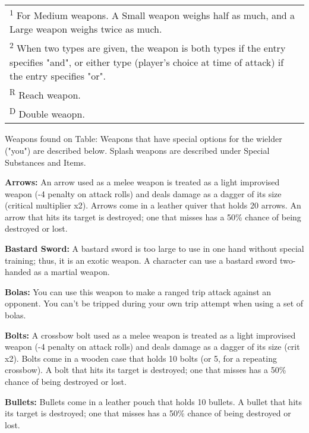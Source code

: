 \begin{table}[htb]
\begin{tabular}{l c c c c c c p{2cm}}
\multicolumn{8}{p{16cm}}{\textsuperscript{1} For Medium weapons. A Small weapon weighs half as much, and a Large weapon weighs twice as much.}\\
\multicolumn{8}{p{16cm}}{\textsuperscript{2} When two types are given, the weapon is both types if the entry specifies "and", or either type (player's choice at time of attack) if the entry specifies "or".}\\
\multicolumn{8}{p{16cm}}{\textsuperscript{R} Reach weapon.}\\
\multicolumn{8}{p{16cm}}{\textsuperscript{D} Double weaopn.}\\
\end{tabular}
\end{table}

Weapons found on Table: Weapons that have special options for the wielder ("you") 
are described below. Splash weapons are described under Special Substances and 
Items.

\textbf{Arrows:} An arrow used as a melee weapon is treated as a light improvised 
weapon (-4 penalty on attack rolls) and deals damage as a dagger of its size (critical 
multiplier x2). Arrows come in a leather quiver that holds 20 arrows. An arrow 
that hits its target is destroyed; one that misses has a 50\% chance of being destroyed 
or lost.

\textbf{Bastard Sword:} A bastard sword is too large to use in one hand without 
special training; thus, it is an exotic weapon. A character can use a bastard sword 
two-handed as a martial weapon.

\textbf{Bolas:} You can use this weapon to make a ranged trip attack against an 
opponent. You can't be tripped during your own trip attempt when using a set of 
bolas.

\textbf{Bolts:} A crossbow bolt used as a melee weapon is treated as a light improvised 
weapon (-4 penalty on attack rolls) and deals damage as a dagger of its size (crit 
x2). Bolts come in a wooden case that holds 10 bolts (or 5, for a repeating crossbow). 
A bolt that hits its target is destroyed; one that misses has a 50\% chance of 
being destroyed or lost.

\textbf{Bullets:} Bullets come in a leather pouch that holds 10 bullets. 
A bullet that hits its target is destroyed; one that misses has a 50\% chance of 
being destroyed or lost.

